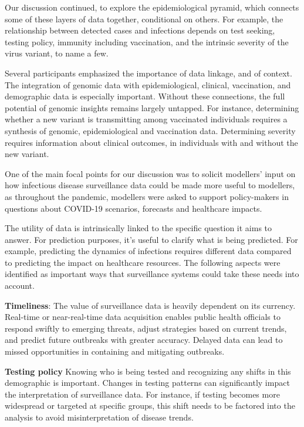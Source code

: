 Our discussion continued, to explore the epidemiological pyramid, which connects some of these layers of data together, conditional on others. For example, the relationship between detected cases and infections depends on test seeking, testing policy, immunity including vaccination, and the intrinsic severity of the virus variant, to name a few.

Several participants emphasized the importance of data linkage, and of context.  The integration of genomic data with epidemiological, clinical, vaccination, and demographic data is especially important. Without these connections, the full potential of genomic insights remains largely untapped. For instance, determining whether a new variant is transmitting among vaccinated individuals requires a synthesis of genomic, epidemiological and vaccination data. Determining severity requires information about clinical outcomes, in individuals with and without the new variant.

One of the main focal points for our discussion was to solicit modellers' input on how infectious disease surveillance data could be made more useful to modellers, as throughout the pandemic, modellers were asked to support policy-makers in questions about COVID-19 scenarios, forecasts and healthcare impacts.

The utility of data is intrinsically linked to the specific question it aims to answer. For prediction purposes, it’s useful to clarify what is being predicted. For example, predicting the dynamics of infections requires different data compared to predicting the impact on healthcare resources. The following aspects were identified as important ways that surveillance systems could take these needs into account.  

{\bf Timeliness}: The value of surveillance data is heavily dependent on its currency. Real-time or near-real-time data acquisition enables public health officials to respond swiftly to emerging threats, adjust strategies based on current trends, and predict future outbreaks with greater accuracy. Delayed data can lead to missed opportunities in containing and mitigating outbreaks.

{\bf Testing policy} Knowing who is being tested and recognizing any shifts in this demographic is important. Changes in testing patterns can significantly impact the interpretation of surveillance data. For instance, if testing becomes more widespread or targeted at specific groups, this shift needs to be factored into the analysis to avoid misinterpretation of disease trends.

